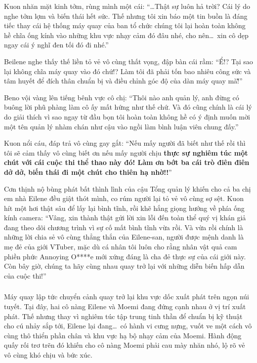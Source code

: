 \documentclass[../main.tex]{subfiles}
\begin{document}
Kuon nhăn mặt kinh tởm, rùng mình một cái: ``\dots Thật sự luôn hả trời? Cái lý do nghe tởm lợm và biến thái hết sức. Thế nhưng tôi xin báo một tin buồn là đáng tiếc thay cái hệ thống máy quay của ban tổ chức chúng tôi lại hoàn toàn không hề chĩa ống kính vào những khu vực nhạy cảm đó đâu nhé, cho nên\dots\ xin cô dẹp ngay cái ý nghĩ đen tối đó đi nhé.''

Beilene nghe thấy thế liền tỏ vẻ vô cùng thất vọng, đập bàn cái rầm: ``Ể!? Tại sao lại không chĩa máy quay vào đó chứ!? Làm tôi đã phải tốn bao nhiêu công sức và tâm huyết để đích thân chuẩn bị và điều chỉnh góc độ của dàn máy quay mà\~!''

Beno vội vàng lên tiếng bênh vực cô chị: ``Thôi nào anh quản lý, anh đừng có buông lời phũ phàng làm cô ấy mất hứng như thế chứ. Và đó cũng chính là cái lý do giải thích vì sao ngay từ đầu bọn tôi hoàn toàn không hề có ý định muốn mời một tên quản lý nhàm chán như cậu vào ngồi làm bình luận viên chung đấy.''

Kuon nổi cáu, đáp trả vô cùng gay gắt: ``Nếu mấy người đã biết như thế rồi thì tôi sẽ cảm thấy vô cùng biết ơn nếu mấy người chịu \textbf{thực sự nghiêm túc một chút với cái cuộc thi thể thao này đó! Làm ơn bớt ba cái trò điên điên dở dở, biến thái đi một chút cho thiên hạ nhờ!!}''

Cơn thịnh nộ bùng phát bất thình lình của cậu Tổng quản lý khiến cho cả ba chị em nhà Eilene đều giật thót mình, co rúm người lại tỏ vẻ vô cùng sợ sệt. Kuon hít một hơi thật sâu để lấy lại bình tĩnh, rồi khẽ hắng giọng hướng về phía ống kính camera: ``Vâng, xin thành thật gửi lời xin lỗi đến toàn thể quý vị khán giả đang theo dõi chương trình vì sự cố mất bình tĩnh vừa rồi. Và vừa rồi chính là những lời chia sẻ vô cùng thẳng thắn của Eilene-san, người được mệnh danh là mẹ đẻ của giới VTuber, mặc dù cá nhân tôi luôn cho rằng nhân vật quả cam phiền phức Annoying O****e mới xứng đáng là cha đẻ thực sự của cái giới này. Còn bây giờ, chúng ta hãy cùng nhau quay trở lại với những diễn biến hấp dẫn của cuộc thi!''

\subsubsection*{\label{ep-003.V}}

Máy quay lập tức chuyển cảnh quay trở lại khu vực dốc xuất phát trên ngọn núi tuyết. Tại đây, hai cô nàng Eilene và Moemi đang đứng cạnh nhau ở vị trí xuất phát. Thế nhưng thay vì nghiêm túc tập trung tinh thần để chuẩn bị kỹ thuật cho cú nhảy sắp tới, Eilene lại đang\dots\ có hành vi cưng nựng, vuốt ve một cách vô cùng thô thiển phần chân và khu vực hạ bộ nhạy cảm của Moemi. Hành động quấy rối trơ trẽn đó khiến cho cô nàng Moemi phải cau mày nhăn nhó, lộ rõ vẻ vô cùng khó chịu và bức xúc.
\end{document}
